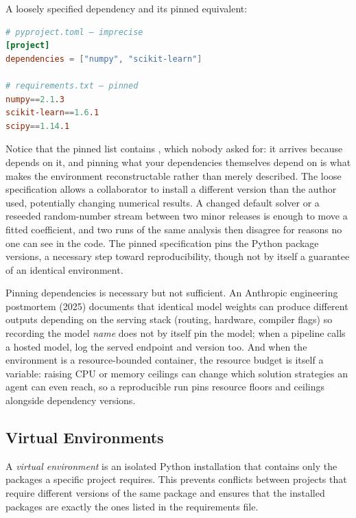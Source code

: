 \begin{example}
A loosely specified dependency and its pinned equivalent:
\begin{lstlisting}[language=toml]
# pyproject.toml — imprecise
[project]
dependencies = ["numpy", "scikit-learn"]

# requirements.txt — pinned
numpy==2.1.3
scikit-learn==1.6.1
scipy==1.14.1
\end{lstlisting}
Notice that the pinned list contains , which nobody asked for: it arrives because  depends on it, and pinning what your dependencies themselves depend on is what makes the environment reconstructable rather than merely described.
The loose specification allows a collaborator to install a different version than the author used, potentially changing numerical results.
A changed default solver or a reseeded random-number stream between two minor releases is enough to move a fitted coefficient, and two runs of the same analysis then disagree for reasons no one can see in the code.
The pinned specification pins the Python package versions, a necessary step toward reproducibility, though not by itself a guarantee of an identical environment.
\end{example}

\begin{remark}
Pinning dependencies is necessary but not sufficient.
An Anthropic engineering postmortem (2025) documents that identical model weights can produce different outputs depending on the serving stack (routing, hardware, compiler flags) so recording the model \emph{name} does not by itself pin the model; when a pipeline calls a hosted model, log the served endpoint and version too.
And when the environment is a resource-bounded container, the resource budget is itself a variable: raising CPU or memory ceilings can change which solution strategies an agent can even reach, so a reproducible run pins resource floors and ceilings alongside dependency versions.
\end{remark}

\subsection{Virtual Environments}

A \emph{virtual environment} is an isolated Python installation that contains only the packages a specific project requires.
This prevents conflicts between projects that require different versions of the same package and ensures that the installed packages are exactly the ones listed in the requirements file.

